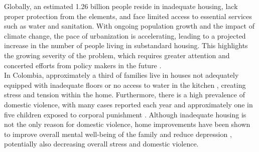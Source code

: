         Globally, an estimated 1.26 billion people reside in inadequate housing, lack proper protection from the elements, and face limited access to essential services such as water and sanitation. With ongoing population growth and the impact of climate change, the pace of urbanization is accelerating, leading to a projected increase in the number of people living in substandard housing. This highlights the growing severity of the problem, which requires greater attention and concerted efforts from policy makers in the future \cite{behr2021introducing}.  \\
        
        In Colombia, approximately a third of families live in houses not adequately equipped with inadequate floors or no access to water in the kitchen \cite{ECV_2021}, creating stress and tension within the home. Furthermore, there is a high prevalence of domestic violence, with many cases reported each year and approximately one in five children exposed to corporal punishment \cite{cuartas2019civil}. Although inadequate housing is not the only reason for domestic violence, home improvements have been shown to improve overall mental well-being of the family \cite{curl2015physical,devoto2012happiness} and reduce depression \cite{cattaneo2009housing}, potentially also decreasing overall stress and domestic violence. \\

